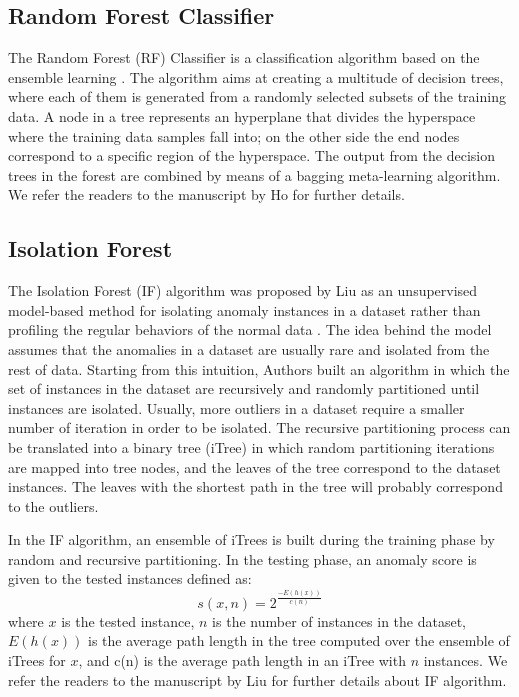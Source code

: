 \subsection{Random Forest Classifier}
The Random Forest (RF) Classifier is a classification algorithm based on the ensemble learning \cite{ho1998random}. The algorithm aims at creating a multitude of decision trees, where each of them is generated from a randomly selected subsets of the training data. A node in a tree represents an hyperplane that divides the hyperspace where the training data samples fall into; on the other side the end nodes correspond to a specific region of the hyperspace. The output from the decision trees in the forest are combined by means of a bagging meta-learning algorithm. We refer the readers to the manuscript by Ho \cite{ho1998random}  for further details.


\subsection{Isolation Forest}
The Isolation Forest (IF) algorithm was proposed by Liu \etal{} as an unsupervised model-based method for isolating anomaly instances in a dataset rather than profiling the regular behaviors of the normal data \cite{liu2008isolation}. The idea behind the model assumes that the anomalies in a dataset are usually rare and isolated from the rest of data. Starting from this intuition, Authors built an algorithm in which the set of instances in the dataset are recursively and randomly partitioned until instances are isolated. Usually, more outliers in a dataset require a smaller number of iteration in order to be isolated. The recursive partitioning process can be translated into a binary tree (iTree) in which random partitioning iterations are mapped into tree nodes, and the leaves of the tree correspond to the dataset instances. The leaves with the shortest path in the tree will probably correspond to the outliers.

In the IF algorithm, an ensemble of iTrees is built during the training phase by random and recursive partitioning. In the testing phase, an anomaly score is given to the tested instances defined as:
\begin{equation}\label{eq:itscore}
    s(x,n) = 2^{\frac{-E(h(x))}{c(n)}}
\end{equation}
where $x$ is the tested instance, $n$ is the number of instances in the dataset, $E(h(x))$ is the average path length in the tree computed over the ensemble of iTrees for $x$, and c(n) is the average path length in an iTree with $n$ instances. We refer the readers to the manuscript by Liu \etal{} \cite{liu2008isolation}  for further details about IF algorithm. 